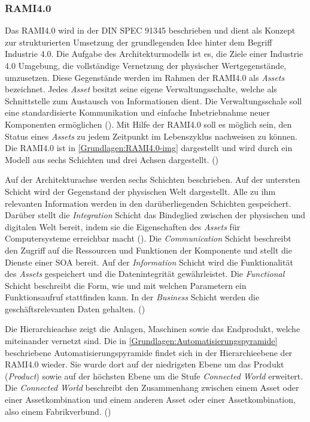 \subsubsection{\ac{RAMI4.0}}
\label{Grundlagen:RAMI4.0}
Das \ac{RAMI4.0} wird in der DIN SPEC 91345 beschrieben und dient als Konzept zur strukturierten Umsetzung der grundlegenden Idee hinter dem Begriff Industrie 4.0. Die Aufgabe des Architekturmodells ist es, die Ziele einer Industrie 4.0 Umgebung, die vollständige Vernetzung der physischer Wertgegenstände, umzusetzen. Diese Gegenstände werden im Rahmen der \ac{RAMI4.0} als \textit{Assets} bezeichnet. Jedes \textit{Asset} besitzt seine eigene Verwaltungsschalte, welche als Schnittstelle zum Austausch von Informationen dient. Die Verwaltungsschale soll eine standardisierte Kommunikation und einfache Inbetriebnahme neuer Komponenten ermöglichen (\cite{rami2016}). Mit Hilfe der \ac{RAMI4.0} soll es möglich sein, den Status eines \textit{Assets} zu jedem Zeitpunkt im Lebenszyklus nachweisen zu können. Die \ac{RAMI4.0} ist in \autoref{Grundlagen:RAMI4.0-img} dargestellt und wird durch ein Modell aus sechs Schichten und drei Achsen dargestellt. (\cite{RAMISpec})

Auf der Architekturachse werden sechs Schichten beschrieben. Auf der untersten Schicht wird der Gegenstand der physischen Welt dargestellt. Alle zu ihm relevanten Information werden in den darüberliegenden Schichten gespeichert. Darüber stellt die \textit{Integration} Schicht das Bindeglied zwischen der physischen und digitalen Welt bereit, indem sie die Eigenschaften des \textit{Assets} für Computersysteme erreichbar macht (\cite{BMWiNeCon2016}). Die \textit{Communication} Schicht beschreibt den Zugriff auf die Ressourcen und Funktionen der Komponente und stellt die Dienste einer \ac{SOA} bereit. Auf der \textit{Information} Schicht wird die Funktionalität des \textit{Assets} gespeichert und die Datenintegrität gewährleistet. Die \textit{Functional} Schicht beschreibt die Form, wie und mit welchen Parametern ein Funktionsaufruf stattfinden kann. In der \textit{Business} Schicht werden die geschäftsrelevanten Daten gehalten. (\cite{RAMISpec})

Die Hierarchieachse zeigt die Anlagen, Maschinen sowie das Endprodukt, welche miteinander vernetzt sind. Die in \autoref{Grundlagen:Automatisierungspyramide} beschriebene Automatisierungspyramide findet sich in der Hierarchieebene der \ac{RAMI4.0} wieder. Sie wurde dort auf der niedrigsten Ebene um das Produkt (\textit{Product}) sowie auf der höchsten Ebene um die Stufe \textit{Connected World} erweitert. Die \textit{Connected World} beschreibt den Zusammenhang zwischen einem Asset oder einer Assetkombination und einem anderen Asset oder einer Assetkombination, also einem Fabrikverbund. (\cite{RAMISpec})

